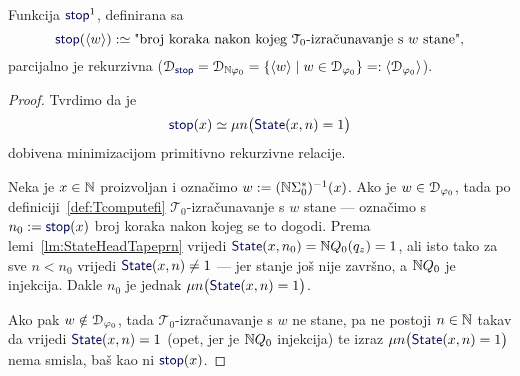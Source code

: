 \begin{lema}[{name=[parcijalna rekurzivnost brojenja koraka do zaustavljanja]}]\label{lm:stopprek}
Funkcija $\f{stop}^1$\!, definirana sa
\begin{equation}
    \f{stop}(\kr w):\simeq\text{"broj koraka nakon kojeg $\mathcal T_0$-izračunavanje s $w$ stane",}
\end{equation}
    parcijalno je rekurzivna ($\dom{\f{stop}}=\dom{\N\varphi_0}=\{\kr w\mid w\in\dom{\varphi_0}\}=:\kr{\dom{\varphi_0}}$).
\end{lema}
\begin{proof}
Tvrdimo da je
\begin{equation}\label{eq:stopdef}
    \f{stop}(x)\simeq\mu n\bigl(\f{State}(x,n)=1\bigr)
\end{equation}
dobivena minimizacijom primitivno rekurzivne relacije.

Neka je $x\in{\mathbb N}$ proizvoljan i označimo $w:=({\mathbb N}\Sigma_0^*)^{-1}(x)$. Ako je $w\in\mathcal D_{\varphi_0}$, tada po definiciji~\ref{def:Tcomputefi} $\mathcal T_0$-izračunavanje s $w$ stane --- označimo s $n_0:=\f{stop}(x)$ broj koraka nakon kojeg se to dogodi. Prema lemi~\ref{lm:StateHeadTapeprn} vrijedi $\f{State}(x,n_0)=\N Q_0(q_z)=1$, ali isto tako za sve $n<n_0$ vrijedi $\f{State}(x,n)\ne 1$ --- jer stanje još nije završno, a ${\mathbb N} Q_0$ je injekcija. Dakle $n_0$ je jednak $\mu n\bigl(\f{State}(x,n)=1\bigr)$.

Ako pak $w\notin\mathcal D_{\varphi_0}$, tada $\mathcal T_0$-izračunavanje s $w$ ne stane, pa ne postoji $n\in{\mathbb N}$ takav da vrijedi $\f{State}(x,n)=1$ (opet, jer je ${\mathbb N} Q_0$ injekcija) te izraz $\mu n\bigl(\f{State}(x,n)=1\bigr)$ nema smisla, baš kao ni $\f{stop}(x)$.
\end{proof}


